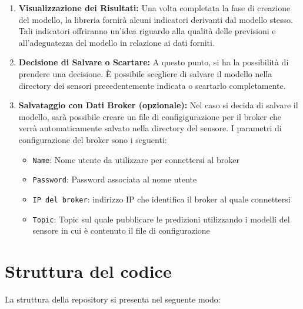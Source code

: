 \documentclass[a4paper,10pt]{article}
\begin{document}
\begin{enumerate}
  \item \textbf{Visualizzazione dei Risultati:} Una volta completata la fase di creazione del modello, la libreria fornirà alcuni indicatori derivanti dal modello stesso. 
  Tali indicatori offriranno un'idea riguardo alla qualità delle previsioni e all'adeguatezza del modello in relazione ai dati forniti.

  \item \textbf{Decisione di Salvare o Scartare:} A questo punto, si ha la possibilità di prendere una decisione. 
  È possibile scegliere di salvare il modello nella directory dei sensori precedentemente indicata o scartarlo completamente.
  
  \item \textbf{Salvataggio con Dati Broker (opzionale):} Nel caso si decida di salvare il modello, sarà possibile creare un file di configigurazione 
  per il broker che verrà automaticamente salvato nella directory del sensore.  I parametri di configurazione del broker sono i seguenti:
  
  \begin{itemize}
    \item \texttt{Name}: Nome utente da utilizzare per connettersi al broker
    \item \texttt{Password}: Password associata al nome utente
    \item \texttt{IP del broker}: indirizzo IP che identifica il broker al quale connettersi
    \item \texttt{Topic}: Topic sul quale pubblicare le predizioni utilizzando i modelli del sensore in cui è contenuto il file di configurazione
  \end{itemize}
\end{enumerate}

\section{Struttura del codice}
La struttura della repository si presenta nel seguente modo:

\end{document}
